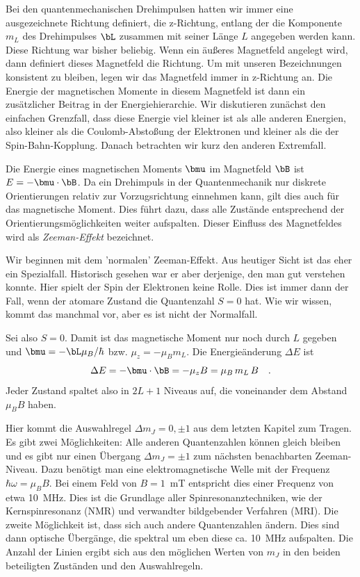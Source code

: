Bei den quantenmechanischen Drehimpulsen hatten wir immer eine ausgezeichnete Richtung definiert, die z-Richtung, entlang der die Komponente $m_L$ des Drehimpulses $\bL$ zusammen mit seiner Länge $L$ angegeben werden kann. Diese Richtung war bisher beliebig. Wenn ein äußeres Magnetfeld angelegt wird, dann definiert dieses Magnetfeld die Richtung. Um mit unseren Bezeichnungen konsistent zu bleiben, legen wir das Magnetfeld immer in z-Richtung an. Die Energie der magnetischen Momente in diesem Magnetfeld ist dann ein zusätzlicher Beitrag in der Energiehierarchie. Wir diskutieren zunächst den einfachen Grenzfall, dass diese Energie viel kleiner ist als alle anderen Energien, also kleiner als die Coulomb-Abstoßung  der Elektronen und kleiner als die der Spin-Bahn-Kopplung. Danach betrachten wir kurz den anderen Extremfall.

Die Energie eines magnetischen Moments $\bmu$ im Magnetfeld $\bB$ ist $E = - \bmu \cdot \bB$. Da ein Drehimpuls in der Quantenmechanik nur diskrete Orientierungen relativ zur Vorzugsrichtung einnehmen kann, gilt dies auch für das magnetische Moment. Dies führt dazu, dass alle Zustände entsprechend der Orientierungsmöglichkeiten weiter aufspalten. Dieser Einfluss des Magnetfeldes wird als \emph{Zeeman-Effekt} bezeichnet. 

Wir beginnen mit dem 'normalen' Zeeman-Effekt. Aus heutiger Sicht ist das eher ein Spezialfall. Historisch gesehen war er aber derjenige, den man gut verstehen konnte. Hier spielt der Spin der Elektronen keine Rolle. Dies ist immer dann der Fall, wenn der atomare Zustand die Quantenzahl $S=0$ hat. Wie wir wissen, kommt das manchmal vor, aber es ist nicht der Normalfall.

Sei also $S=0$. Damit ist das magnetische Moment nur noch durch $L$ gegeben und $\bmu = - \bL \mu_B / \hbar$ bzw. $\mu_z = - \mu_B  m_L$. Die Energieänderung $\Delta E$ ist
\begin{equation}
    \Delta E = - \bmu \cdot \bB =- \mu_z B =  \mu_B \, m_L \, B  \quad .
\end{equation}
Jeder Zustand spaltet also in $2L + 1$ Niveaus auf, die voneinander dem Abstand $\mu_B B$ haben.

Hier kommt die Auswahlregel $\Delta m_J = 0, \pm1$ aus dem letzten Kapitel zum Tragen. Es gibt zwei Möglichkeiten: Alle anderen Quantenzahlen können gleich bleiben und es gibt nur einen Übergang $\Delta m_J = \pm1$ zum nächsten benachbarten Zeeman-Niveau. Dazu benötigt man eine elektromagnetische Welle mit der Frequenz $\hbar \omega = \mu_B B$. Bei einem Feld von $B=1$~mT entspricht dies einer Frequenz von etwa 10~MHz. Dies ist die Grundlage aller Spinresonanztechniken, wie der Kernspinresonanz (NMR) und verwandter bildgebender Verfahren (MRI). Die zweite Möglichkeit ist, dass sich auch andere Quantenzahlen ändern. Dies sind dann optische Übergänge, die spektral um eben diese ca. 10~MHz aufspalten. Die Anzahl der Linien ergibt sich aus den möglichen Werten von $m_J$ in den beiden beteiligten Zuständen und den Auswahlregeln.


